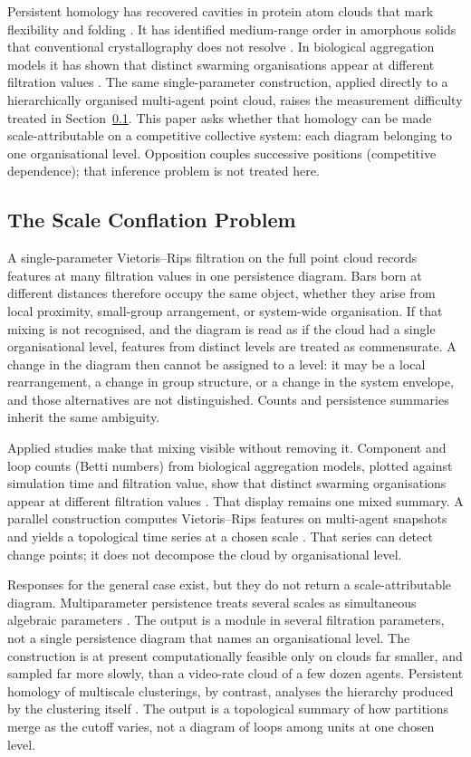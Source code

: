 Persistent homology has recovered cavities in protein atom clouds that
mark flexibility and folding \citep{xia2014}. It has identified
medium-range order in amorphous solids that conventional crystallography
does not resolve \citep{hiraoka2016}. In biological aggregation models
it has shown that distinct swarming organisations appear at different
filtration values \citep{topaz2015}. The same single-parameter
construction, applied directly to a hierarchically organised multi-agent
point cloud, raises the measurement difficulty treated in
Section~\ref{sec:scaleconflation}. This paper asks whether that homology
can be made scale-attributable on a competitive collective system:
each diagram belonging to one organisational level. Opposition couples
successive positions (competitive dependence); that inference problem
is not treated here.

\subsection{The Scale Conflation Problem}
\label{sec:scaleconflation}

A single-parameter Vietoris--Rips filtration on the full point cloud
records features at many filtration values in one persistence diagram.
Bars born at different distances therefore occupy the same object,
whether they arise from local proximity, small-group arrangement, or
system-wide organisation. If that mixing is not recognised, and the
diagram is read as if the cloud had a single organisational level,
features from distinct levels are treated as commensurate. A change in
the diagram then cannot be assigned to a level: it may be a local
rearrangement, a change in group structure, or a change in the system
envelope, and those alternatives are not distinguished. Counts and
persistence summaries inherit the same ambiguity.

Applied studies make that mixing visible without removing it.
Component and loop counts (Betti numbers) from biological aggregation
models, plotted against simulation time and filtration value, show
that distinct swarming organisations appear at different filtration
values \citep{topaz2015}. That display remains one mixed summary. A parallel construction computes
Vietoris--Rips features on multi-agent snapshots and yields a
topological time series at a chosen scale \citep{gu2022}. That series
can detect change points; it does not decompose the cloud by
organisational level.

Responses for the general case exist, but they do not return a
scale-attributable diagram. Multiparameter persistence treats several
scales as simultaneous algebraic parameters \citep{botnan2022}. The
output is a module in several filtration parameters, not a single
persistence diagram that names an organisational level. The
construction is at present computationally feasible only on clouds far
smaller, and sampled far more slowly, than a video-rate cloud of a few
dozen agents. Persistent homology of multiscale clusterings, by
contrast, analyses the hierarchy produced by the clustering itself
\citep{schindler2023}. The output is a topological summary of how
partitions merge as the cutoff varies, not a diagram of loops among
units at one chosen level.

